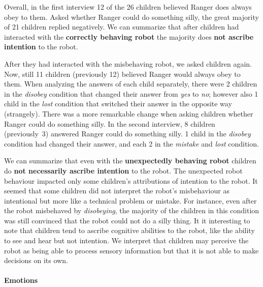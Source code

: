 \documentclass{sig-alternate}
\begin{document}

Overall, in the first interview 12 of the 26 children believed Ranger does
always obey to them. Asked whether Ranger could do something silly, the great
majority of 21 children replied negatively. We can summarize that after children
had interacted with the \textbf{correctly behaving robot} the majority does
\textbf{not ascribe intention} to the robot.

After they had interacted with the misbehaving robot, we asked children again.
Now, still 11 children (previously 12) believed Ranger would always obey to
them. When analyzing the answers of each child separately, there were 2 children
in the \textit{disobey} condition that changed their answer from \textit{yes} to
\textit{no}; however also 1 child in the \textit{lost} condition that switched
their answer in the opposite way (strangely). There was a more remarkable change
when asking children whether Ranger could do something silly. In the second
interview, 8 children (previously~3) answered Ranger could do something silly. 1
child in the \textit{disobey} condition had changed their answer, and each 2 in
the \textit{mistake} and \textit{lost} condition. 

We can summarize that even with the \textbf{unexpectedly behaving robot}
children do \textbf{not necessarily ascribe intention} to the robot. The
unexpected robot behaviour impacted only some children's attributions of
intention to the robot.  It seemed that some children did not interpret the
robot's misbehaviour as intentional but more like a technical problem or
mistake. For instance, even after the robot misbehaved by \textit{disobeying},
the majority of the children in this condition was still convinced that the
robot could not do a silly thing.  It it interesting to note that children tend
to ascribe cognitive abilities to the robot, like the ability to see and hear
but not intention. We interpret that children may perceive the robot as being
able to process sensory information but that it is not able to make decisions on
its own. 

\paragraph{Emotions}
\end{document}
